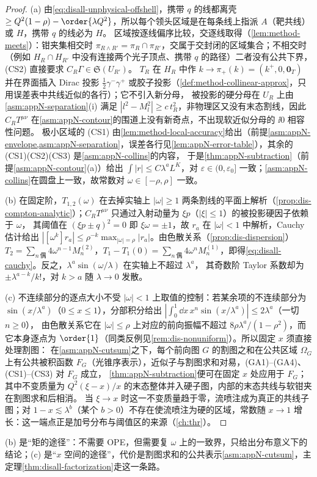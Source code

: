 \begin{proof}
(a) 由\cref{eq:disall-unphysical-offshell}，携带 $q$ 的线都离壳 $\ge Q^2(1-\rho)-\order{\lambda Q^2}$，所以每个领头区域是在每条线上指派 $A$（靶共线）或 $H$，携带 $q$ 的线必为 $H$。
区域按逐线偏序比较，交逐线取得（\cref{lem:method-meets}）：钳夹集相交时 $\pi_{R\wedge R'}=\pi_R\cap\pi_{R'}$，交属于交封闭的区域集合；不相交时（例如 $H_R\cap H_{R'}$ 中没有连接两个光子顶点、携带 $q$ 的路径）二者没有公共下界，(CS2) 直接要求 $C_R\Gamma\in\mathfrak S(U_{R'})$。
$T_R$ 在 $H_R$ 中作 $k\to\pi_+(k)=(k^+,0,\mathbf 0_T)$ 并在界面插入 Dirac 投影 $\frac12\gamma^-\gamma^+$ 或胶子投影（\cref{def:method-collinear-approx}，只用误差表中共线近似的各行）；它不引入新分母，
被投影的硬分母在 $U_R$ 上由\cref{asm:appN-separation}(i) 满足 $|l^2-M_l^2|\ge c\,t_R^2$，非物理区又没有末态割线，因此 $C_RT^{\mu\nu}$ 在\cref{asm:appN-contour}的围道上没有新奇点，不出现软近似分母的 $\ii0$ 相容性问题。
极小区域的 (CS1) 由\cref{lem:method-local-accuracy}给出（前提\cref{asm:appN-envelope,asm:appN-separation}，误差各行见\cref{lem:appN-error-table}），其余的 (CS1)(CS2)(CS3) 是\cref{asm:appN-collins}的内容，
于是\cref{thm:appN-subtraction}（前提\cref{asm:appN-contour}(a)）给出 $\int|r|\le C\lambda^aL^K$，对 $\varepsilon\in(0,\varepsilon_0]$ 一致；\cref{asm:appN-collins}在圆盘上一致，故常数对 $\omega\in[-\rho,\rho]$ 一致。

(b) 在固定阶，$T_{1,2}(\omega)$ 在去掉实轴上 $|\omega|\ge1$ 两条割线的平面上解析（\cref{prop:dis-compton-analytic}）；$C_RT^{\mu\nu}$ 只通过入射动量为 $\xi p$（$|\xi|\le1$）的被投影硬因子依赖于 $\omega$，
其阈值在 $(\xi p\pm q)^2=0$ 即 $\xi\omega=\pm1$，故 $r_a$ 在 $|\omega|<1$ 中解析，Cauchy 估计给出 $|[\omega^k]r_a|\le\rho^{-k}\max_{|\omega|=\rho}|r_a|$。由色散关系（\cref{prop:dis-dispersion}）
$T_2=\sum_{n\ \text{偶}}4\omega^{n-1}M^{(2)}_n$，$T_1-T_1(0)=\sum_{n\ \text{偶}}4\omega^nM^{(1)}_n$，即得\cref{eq:disall-cauchy}。反之，$\lambda^a\sin(\omega/\lambda)$ 在实轴上不超过 $\lambda^a$，
其奇数阶 Taylor 系数却为 $\pm\lambda^{a-k}/k!$，对 $k>a$ 随 $\lambda\to0$ 发散。

(c) 不连续部分的逐点大小不受 $|\omega|<1$ 上取值的控制：若某余项的不连续部分为 $\sin(x/\lambda^a)$（$0\le x\le1$），分部积分给出 $|\int_0^1\dd x\,x^n\sin(x/\lambda^a)|\le2\lambda^a$（一切 $n\ge0$），
由色散关系它在 $|\omega|\le\rho$ 上对应的前向振幅不超过 $8\rho\lambda^a/(1-\rho^2)$，而它本身逐点为 $\order{1}$（同类反例见\cref{rem:dis-nonuniform}）。所以固定 $x$ 须直接处理割图：
在\cref{asm:appN-cutsum}之下，每个前向图 $G$ 的割图之和在公共区域 $\Omega_G$ 上有公共被积函数 $F_G$（光锥序表示），近似子与割图求和对易，(GA1)–(GA4)、(CS1)–(CS3) 对 $F_G$ 成立，
\cref{thm:appN-subtraction}便可在固定 $x$ 处应用于 $F_G$；其中不变质量为 $Q^2(\xi-x)/x$ 的末态整体并入硬子图，内部的末态共线与软钳夹在割图求和后相消。
当 $\xi\to x$ 时这一不变质量趋于零，流喷注成为真正的共线子图；对 $1-x\lesssim\lambda^b$（某个 $b>0$）不存在使流喷注为硬的区域，常数随 $x\to1$ 增长：这一端点正是加号分布与阈值区的来源（\cref{ch:thr}）。
\end{proof}

\noindent
(b) 是“矩的途径”：不需要 OPE，但需要复 $\omega$ 上的一致界，只给出分布意义下的结论；(c) 是“$x$ 空间的途径”，代价是割图求和的公共表示\cref{asm:appN-cutsum}，主定理\cref{thm:disall-factorization}走这一条路。
